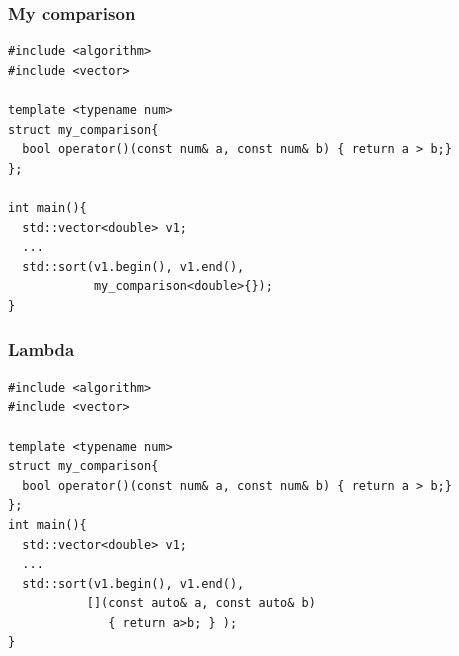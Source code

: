 \begin{frame}[fragile]
  \frametitle{My comparison}
\begin{lstlisting}
#include <algorithm>
#include <vector>
  
template <typename num>
struct my_comparison{
  bool operator()(const num& a, const num& b) { return a > b;}
};
  
int main(){
  std::vector<double> v1;
  ...
  std::sort(v1.begin(), v1.end(),
            my_comparison<double>{});
}
\end{lstlisting}
\end{frame}

\begin{frame}[fragile]
  \frametitle{Lambda}
\begin{lstlisting}
#include <algorithm>
#include <vector>

template <typename num>
struct my_comparison{
  bool operator()(const num& a, const num& b) { return a > b;}
};
int main(){
  std::vector<double> v1;
  ...
  std::sort(v1.begin(), v1.end(),
           [](const auto& a, const auto& b)
              { return a>b; } );
}
\end{lstlisting}
\end{frame}
